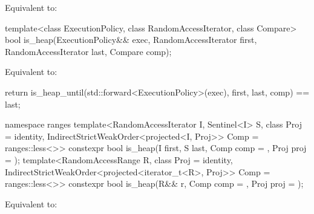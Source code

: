 \begin{itemdescr}
\pnum
\effects
Equivalent to: 
\end{itemdescr}

%
\begin{itemdecl}
template<class ExecutionPolicy, class RandomAccessIterator, class Compare>
  bool is_heap(ExecutionPolicy&& exec,
               RandomAccessIterator first, RandomAccessIterator last,
               Compare comp);
\end{itemdecl}

\begin{itemdescr}
\pnum
\effects
Equivalent to:
\begin{codeblock}
return is_heap_until(std::forward<ExecutionPolicy>(exec), first, last, comp) == last;
\end{codeblock}
\end{itemdescr}

%
\begin{itemdecl}
namespace ranges {
  template<RandomAccessIterator I, Sentinel<I> S, class Proj = identity,
           IndirectStrictWeakOrder<projected<I, Proj>> Comp = ranges::less<>>
    constexpr bool is_heap(I first, S last, Comp comp = {}, Proj proj = {});
  template<RandomAccessRange R, class Proj = identity,
           IndirectStrictWeakOrder<projected<iterator_t<R>, Proj>> Comp = ranges::less<>>
    constexpr bool is_heap(R&& r, Comp comp = {}, Proj proj = {});
}
\end{itemdecl}

\begin{itemdescr}
\pnum
\effects
Equivalent to:
\end{itemdescr}

